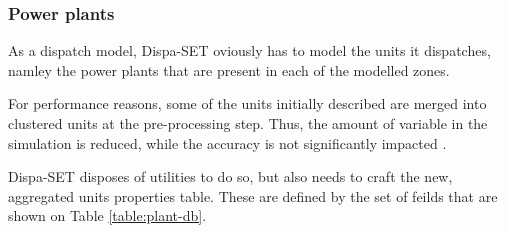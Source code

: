 \subsubsection{Power plants}

As a dispatch model, Dispa-SET oviously has to model the units it dispatches, namley the power plants that are present in each of the modelled zones.

For performance reasons, some of the units initially described are merged into clustered units at the pre-processing step. Thus, the amount of variable in the simulation is reduced, while the accuracy is not significantly impacted \cite{dispaset}.

Dispa-SET disposes of utilities to do so, but also needs to craft the new, aggregated units properties table. These are defined by the set of feilds that are shown on Table \ref{table:plant-db}.

